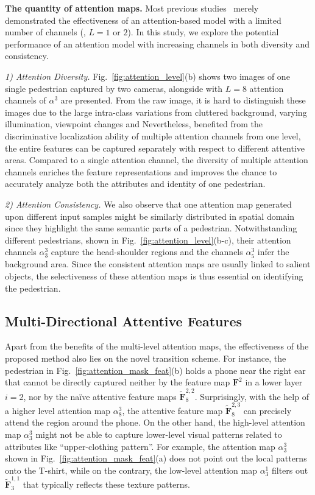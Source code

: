 \documentclass[10pt,twocolumn,letterpaper]{article}
\begin{document}
\noindent\textbf{The quantity of attention maps.}
%
Most previous studies~\cite{xu2015show,newell2016stacked} merely demonstrated the effectiveness of an attention-based model with a limited number of channels (\ie, $L=1$ or $2$).
%
In this study, we explore the potential performance of an attention model with increasing channels in both diversity and consistency.

\textit{1) Attention Diversity.}
%
Fig.~\ref{fig:attention_level}(b) shows two images of one single pedestrian captured by two cameras, alongside with $L=8$ attention channels of $\alpha^3$ are presented.
%
From the raw image, it is hard to distinguish these images due to the large intra-class variations from cluttered background, varying illumination, viewpoint changes and \etc
%
Nevertheless, benefited from the discriminative localization ability of multiple attention channels from one level, the entire features can be captured separately with respect to different attentive areas.
%
Compared to a single attention channel, the diversity of multiple attention channels enriches the feature representations and improves the chance to accurately analyze both the attributes and identity of one pedestrian.

\textit{2) Attention Consistency.}
%
We also observe that one attention map generated upon different input samples might be similarly distributed in spatial domain since they highlight the same semantic parts of a pedestrian.
%
Notwithstanding different pedestrians, shown in Fig.~\ref{fig:attention_level}(b-c), their attention channels $\alpha_3^3$ capture the head-shoulder regions and the channels $\alpha^3_5$ infer the background area.
%
Since the consistent attention maps are usually linked to salient objects, the selectiveness of these attention maps is thus essential on identifying the pedestrian.


\subsection{Multi-Directional Attentive Features}
\label{subsec:multi_directional_attentive_features}

Apart from the benefits of the multi-level attention maps, the effectiveness of the proposed method also lies on the novel transition scheme.
%
For instance, the pedestrian in Fig.~\ref{fig:attention_mask_feat}(b) holds a phone near the right ear that cannot be directly captured neither by the feature map $\mathbf{F}^2$ in a lower layer $i=2$, nor by the na\"ive attentive feature maps $\tilde{\mathbf{F}}^{2,2}_8$.
%
Surprisingly, with the help of a higher level attention map $\alpha^3_8$, the attentive feature map $\tilde{\mathbf{F}}^{2,3}_8$ can precisely attend the region around the phone.
%
On the other hand, the high-level attention map $\alpha^3_3$ might not be able to capture lower-level visual patterns related to attributes like ``upper-clothing pattern''.
%
For example, the attention map $\alpha^3_3$ shown in Fig.~\ref{fig:attention_mask_feat}(a) does not point out the local patterns onto the T-shirt, while on the contrary, the low-level attention map $\alpha^1_3$ filters out $\tilde{\mathbf{F}}^{1,1}_3$ that typically reflects these texture patterns.
\end{document}
